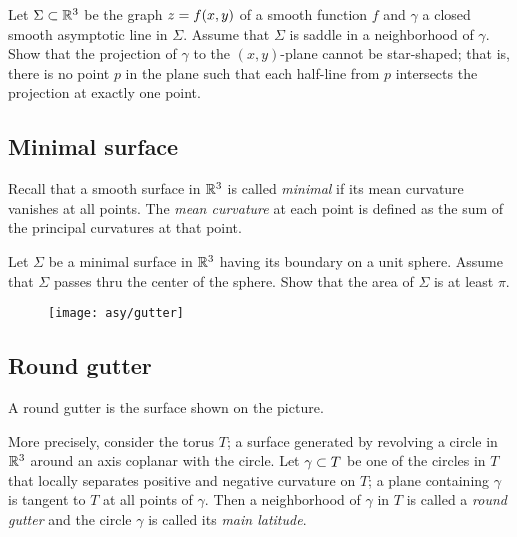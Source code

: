\begin{pr}
Let $\Sigma\subset \mathbb{R}^3$ be the graph $z\z=f(x,y)$
of a smooth function $f$ 
and $\gamma$ a closed smooth asymptotic line in $\Sigma$.
Assume that $\Sigma$ is saddle in a neighborhood of $\gamma$.
Show that the projection of $\gamma$ to the $(x, y)$-plane cannot be star-shaped;
that is, there is no point $p$ in the plane such that each half-line from $p$ intersects the projection at exactly one point.
\end{pr}

\subsection*{Minimal surface}
\label{min-surf}

Recall that a smooth surface in $\mathbb{R}^3$ is called \emph{minimal} if its mean curvature vanishes at all points.
The \emph{mean curvature} at each point is defined as the sum of the principal curvatures at that point.

\begin{pr}
Let $\Sigma$ be a minimal surface in $\mathbb{R}^3$ having its boundary on a unit sphere.
Assume that $\Sigma$ passes thru the center of the sphere.
Show that the area of $\Sigma$ is at least $\pi$.
\end{pr}

{

\begin{wrapfigure}[3]{r}{43 mm}
\vskip-4mm
\centering
\texttt{[image: asy/gutter]}
\end{wrapfigure}

\subsection*{Round gutter\hard}
\label{half-torus}

A round gutter is the surface shown on the picture.

}

More precisely, consider the torus $T$; a surface generated by revolving a circle in $\mathbb{R}^3$ around an axis coplanar with the circle.
Let $\gamma\z\subset T$ be one of the circles in $T$ that locally separates positive and negative curvature on $T$;
a plane containing $\gamma$ is tangent to $T$ at all points of $\gamma$.
Then a neighborhood of $\gamma$ in $T$ is called 
a \emph{round gutter}
and the circle $\gamma$ is called its {}\emph{main latitude}.



